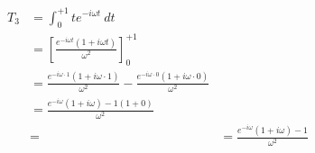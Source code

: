 \documentclass[preview]{standalone}
\begin{document}
\begin{align*}
T_{3}&= \int_{0}^{+1}t e^{-i\omega t} \ dt \\&=\left[\frac{e^{-i\omega t}(1+i\omega t)}{\omega^{2}}\right]_{0}^{+1} \\ &=\frac{e^{-i\omega\cdot 1}(1+i\omega\cdot 1)}{\omega^{2}}-\frac{e^{-i\omega\cdot 0}(1+i\omega\cdot 0)}{\omega^{2}} \\ &=\frac{e^{-i\omega}(1+i\omega)-1(1+0)}{\omega^{2}} \\ &= &=\frac{e^{-i\omega}(1+i\omega)-1}{\omega^{2}}
\end{align*}
\end{document}
